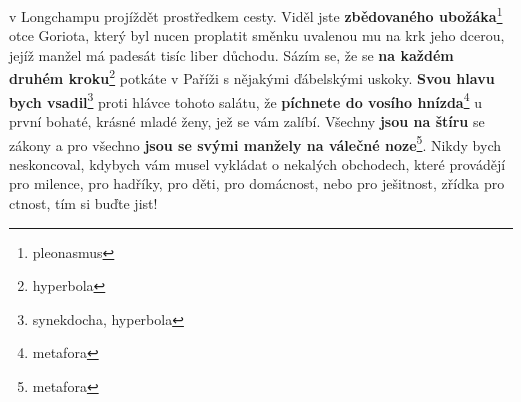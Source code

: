 \documentclass[10pt,a4paper]{article}
\begin{document}
v Longchampu projíždět prostředkem cesty. Viděl jste
\textbf{zbědovaného ubožáka}\footnote{pleonasmus} otce Goriota, který byl nucen proplatit
směnku uvalenou mu na krk jeho dcerou, jejíž manžel má padesát
tisíc liber důchodu. Sázím se, že se \textbf{na každém druhém kroku}\footnote{hyperbola}
potkáte v Paříži s nějakými ďábelskými uskoky. \textbf{Svou hlavu bych
vsadil}\footnote{synekdocha, hyperbola} proti hlávce tohoto salátu, že \textbf{píchnete do vosího hnízda}\footnote{metafora} u
první bohaté, krásné mladé ženy, jež se vám zalíbí. Všechny \textbf{jsou
na štíru} se zákony a pro všechno \textbf{jsou se svými manžely na válečné
noze}\footnote{metafora}. Nikdy bych neskoncoval, kdybych vám musel vykládat o
nekalých obchodech, které provádějí pro milence, pro hadříky, pro
děti, pro domácnost, nebo pro ješitnost, zřídka pro ctnost, tím si
buďte jist!


\newpage
\end{document}
